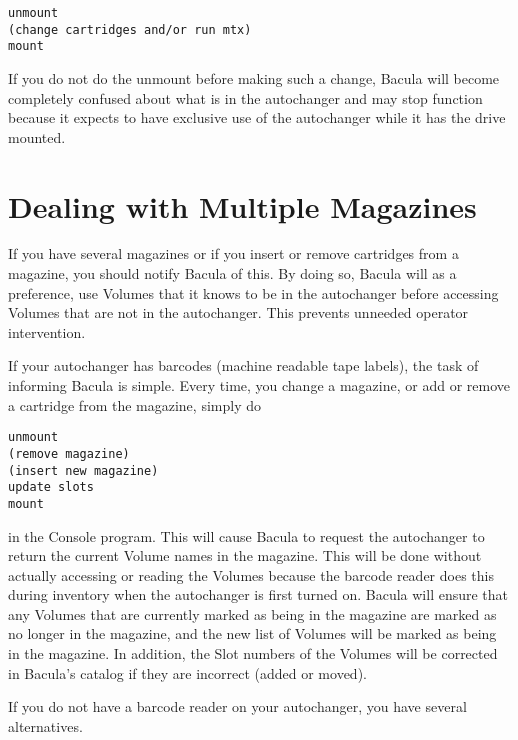 \footnotesize
\begin{verbatim}
unmount
(change cartridges and/or run mtx)
mount
\end{verbatim}
\normalsize

If you do not do the unmount before making such a change, Bacula
will become completely confused about what is in the autochanger
and may stop function because it expects to have exclusive use
of the autochanger while it has the drive mounted.


\label{Magazines}
\section{Dealing with Multiple Magazines}

If you have several magazines or if you insert or remove cartridges from a
magazine, you should notify Bacula of this. By doing so, Bacula will as
a preference, use Volumes that it knows to be in the autochanger before
accessing Volumes that are not in the autochanger. This prevents unneeded
operator intervention. 

If your autochanger has barcodes (machine readable tape labels), the task of
informing Bacula is simple. Every time, you change a magazine, or add or
remove a cartridge from the magazine, simply do 

\footnotesize
\begin{verbatim}
unmount
(remove magazine)
(insert new magazine)
update slots
mount
\end{verbatim}
\normalsize

in the Console program. This will cause Bacula to request the autochanger to
return the current Volume names in the magazine. This will be done without
actually accessing or reading the Volumes because the barcode reader does this
during inventory when the autochanger is first turned on. Bacula will ensure
that any Volumes that are currently marked as being in the magazine are marked
as no longer in the magazine, and the new list of Volumes will be marked as
being in the magazine. In addition, the Slot numbers of the Volumes will be
corrected in Bacula's catalog if they are incorrect (added or moved). 

If you do not have a barcode reader on your autochanger, you have several
alternatives. 

